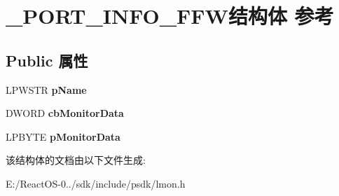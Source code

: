 \hypertarget{struct___p_o_r_t___i_n_f_o___f_f_w}{}\section{\+\_\+\+P\+O\+R\+T\+\_\+\+I\+N\+F\+O\+\_\+\+F\+F\+W结构体 参考}
\label{struct___p_o_r_t___i_n_f_o___f_f_w}
\subsection*{Public 属性}
\begin{DoxyCompactItemize}
\item 
\mbox{\label{struct___p_o_r_t___i_n_f_o___f_f_w_a0637e38fcf799c90f2993792fb636ab4}} 
L\+P\+W\+S\+TR {\bfseries p\+Name}
\item 
\mbox{\label{struct___p_o_r_t___i_n_f_o___f_f_w_a7e5000437847c581a0359206a47b9abe}} 
D\+W\+O\+RD {\bfseries cb\+Monitor\+Data}
\item 
\mbox{\label{struct___p_o_r_t___i_n_f_o___f_f_w_a386ab85b6787be6565fbeb7390f3936e}} 
L\+P\+B\+Y\+TE {\bfseries p\+Monitor\+Data}
\end{DoxyCompactItemize}


该结构体的文档由以下文件生成\+:\begin{DoxyCompactItemize}
\item 
E\+:/\+React\+O\+S-\/0../sdk/include/psdk/lmon.\+h\end{DoxyCompactItemize}
